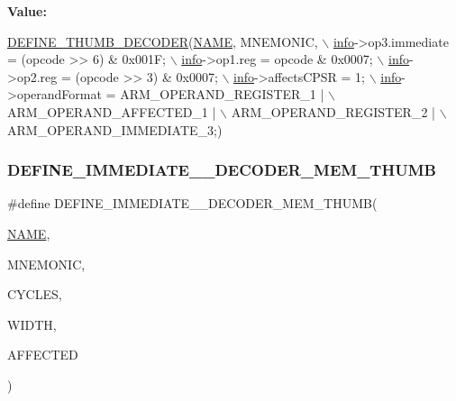 {\bfseries Value\+:}
\begin{DoxyCode}
\mbox{\hyperlink{decoder-thumb_8c_a44d34ec3fd7c2c2ee51ff5966678c86e}{DEFINE\_THUMB\_DECODER}}(\mbox{\hyperlink{inflate_8h_a164ea0159d5f0b5f12a646f25f99eceaa67bc2ced260a8e43805d2480a785d312}{NAME}}, MNEMONIC, \(\backslash\)
        \mbox{\hyperlink{libretro_8h_structretro__game__info}{info}}->op3.immediate = (opcode >> 6) & 0x001F; \(\backslash\)
        \mbox{\hyperlink{libretro_8h_structretro__game__info}{info}}->op1.reg = opcode & 0x0007; \(\backslash\)
        \mbox{\hyperlink{libretro_8h_structretro__game__info}{info}}->op2.reg = (opcode >> 3) & 0x0007; \(\backslash\)
        \mbox{\hyperlink{libretro_8h_structretro__game__info}{info}}->affectsCPSR = 1; \(\backslash\)
        \mbox{\hyperlink{libretro_8h_structretro__game__info}{info}}->operandFormat = ARM\_OPERAND\_REGISTER\_1 | \(\backslash\)
            ARM\_OPERAND\_AFFECTED\_1 | \(\backslash\)
            ARM\_OPERAND\_REGISTER\_2 | \(\backslash\)
            ARM\_OPERAND\_IMMEDIATE\_3;)
\end{DoxyCode}
\mbox{\label{decoder-thumb_8c_a2012fa2b9f2dc113af070a559b771149}} 
\subsubsection{\texorpdfstring{D\+E\+F\+I\+N\+E\+\_\+\+I\+M\+M\+E\+D\+I\+A\+T\+E\+\_\+\_\+\+D\+E\+C\+O\+D\+E\+R\+\_\+\+M\+E\+M\+\_\+\+T\+H\+U\+MB}{DEFINE\_IMMEDIATE\_5\_DECODER\_MEM\_THUMB}}
{\footnotesize\ttfamily \#define D\+E\+F\+I\+N\+E\+\_\+\+I\+M\+M\+E\+D\+I\+A\+T\+E\+\_\+\_\+\+D\+E\+C\+O\+D\+E\+R\+\_\+\+M\+E\+M\+\_\+\+T\+H\+U\+MB(\begin{DoxyParamCaption}\item[{}]{\mbox{\hyperlink{inflate_8h_a164ea0159d5f0b5f12a646f25f99eceaa67bc2ced260a8e43805d2480a785d312}{N\+A\+ME}},  }\item[{}]{M\+N\+E\+M\+O\+N\+IC,  }\item[{}]{C\+Y\+C\+L\+ES,  }\item[{}]{W\+I\+D\+TH,  }\item[{}]{A\+F\+F\+E\+C\+T\+ED }\end{DoxyParamCaption})}

